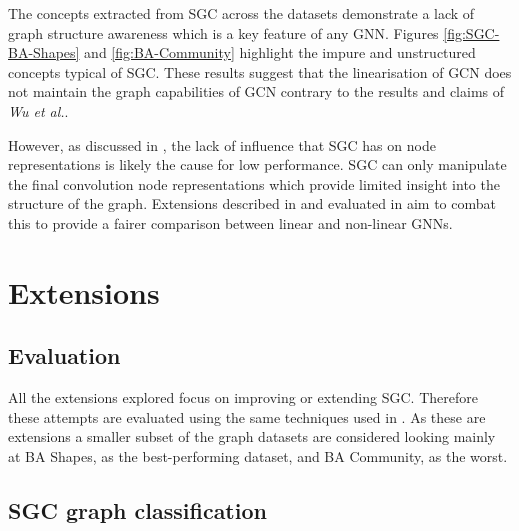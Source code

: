 The concepts extracted from SGC across the datasets demonstrate a lack of graph structure awareness which is a key feature of any GNN.
Figures \ref{fig:SGC-BA-Shapes} and \ref{fig:BA-Community} highlight the impure and unstructured concepts typical of SGC.
These results suggest that the linearisation of GCN does not maintain the graph capabilities of GCN contrary to the results and claims of \textit{Wu et al.}.

However, as discussed in , the lack of influence that SGC has on node representations is likely the cause for low performance.
SGC can only manipulate the final convolution node representations which provide limited insight into the structure of the graph.
Extensions described in  and evaluated in  aim to combat this to provide a fairer comparison between linear and non-linear GNNs.

\section{Extensions}
\label{sec:extension-eval}
\subsection{Evaluation}
All the extensions explored focus on improving or extending SGC.
Therefore these attempts are evaluated using the same techniques used in .
As these are extensions a smaller subset of the graph datasets are considered looking mainly at BA Shapes, as the best-performing dataset, and BA Community, as the worst.

\subsection{SGC graph classification}
\label{SGC-graph}



